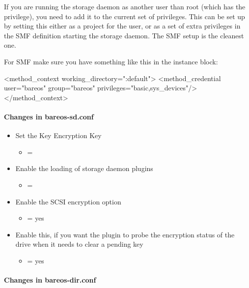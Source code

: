 If you are running the storage daemon as another user than root (which has the  privilege), you need to add it to the current set of privileges.
This can be set up by setting this either as a project for the user, or as a set of extra privileges in the SMF definition starting the storage daemon. The SMF setup is the cleanest one.

For SMF make sure you have something like this in the instance block:

\begin{bconfig}{}
<method_context working_directory=":default"> <method_credential user="bareos" group="bareos" privileges="basic,sys_devices"/> </method_context>
\end{bconfig}

\paragraph{Changes in bareos-sd.conf}

\begin{itemize}
 \item Set the Key Encryption Key
   \begin{itemize}
   \item {} = 
   \end{itemize}
 \item Enable the loading of storage daemon plugins
   \begin{itemize}
   \item {} = 
   \end{itemize}
 \item Enable the SCSI encryption option
   \begin{itemize}
   \item {} = yes
   \end{itemize}
 \item Enable this, if you want the plugin to probe the encryption status of the drive when it needs to clear a pending key
   \begin{itemize}
   \item {} = yes
   \end{itemize}
\end{itemize}

\paragraph{Changes in bareos-dir.conf}

